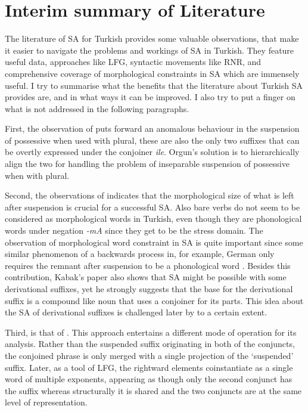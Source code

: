 \section{Interim summary of Literature}

The literature of SA for Turkish provides some valuable observations, that make it easier to navigate the problems and workings of SA in Turkish. They feature useful data, approaches like LFG, syntactic movements like RNR, and comprehensive coverage of morphological constraints in SA which are immensely useful. I try to summarise what the benefits that the literature about Turkish SA provides are, and in what ways it can be improved. I also try to put a finger on what is not addressed in the following paragraphs.  

First, the observation of \cite{orgun1995flat} puts forward an anomalous behaviour in the suspension of possessive when used with plural, these are also the only two suffixes that can be overtly expressed under the conjoiner \textit{ile}. Orgun's solution is to hierarchically align the two for handling the problem of inseparable suspension of possessive when with plural.

Second, the observations of \cite{kabak2007turkish} indicates that the morphological size of what is left after suspension is crucial for a successful SA. Also bare verbs do not seem to be considered as morphological words in Turkish, even though they are phonological words under negation \textit{-mA} since they get to be the stress domain. The observation of morphological word constraint in SA is quite important since some similar phenomenon of a backwards process in, for example, German only requires the remnant after suspension to be a phonological word \citep{smith2000word, pounder2006broken,kenesei2007semiwords}. Besides this contribution, Kabak's paper also shows that SA might be possible with some derivational suffixes, yet he strongly suggests that the base for the derivational suffix is a compound like noun that uses a conjoiner for its parts. This idea about the SA of derivational suffixes is challenged later by \cite{akkucs2016suspended} to a certain extent.

Third, is that of \cite{broadwell2008turkish}. This approach entertains a different mode of operation for its analysis. Rather than the suspended suffix originating in both of the conjuncts, the conjoined phrase is only merged with a single projection of the `suspended' suffix. Later, as a tool of LFG, the rightward elements coinstantiate as a single word of multiple exponents, appearing as though only the second conjunct has the suffix whereas structurally it is shared and the two conjuncts are at the same level of representation.

